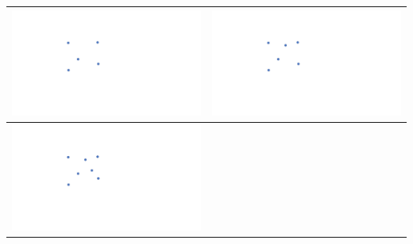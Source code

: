 \documentclass[a4paper,12pt]{article}
\begin{document}
\begin{tabular}{|c|c|}
\hline
\hspace{10pt}\includegraphics[width=0.425\linewidth]{../images/voronoi5.pdf}\hspace{10pt} & \hspace{10pt}\includegraphics[width=0.425\linewidth]{../images/voronoi6.pdf}\hspace{10pt} \\
\hline
\hspace{10pt}\includegraphics[width=0.425\linewidth]{../images/voronoi7.pdf}\hspace{10pt} \\
\cline{1-1}
\end{tabular}
\end{document}
